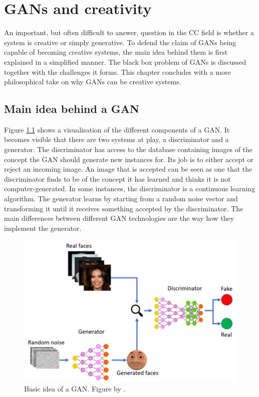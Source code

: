 \chapter{GANs and creativity}
\label{ch:generative_or_creative}


An important, but often difficult to answer, question in the CC field is whether a system is creative or simply generative.
To defend the claim of GANs being capable of becoming creative systems, the main idea behind them is first explained in a simplified manner.
The black box problem of GANs is discussed together with the challenges it forms.
This chapter concludes with a more philosophical take on why GANs can be creative systems.

\section{Main idea behind a GAN}
\label{sec:main_idea_GAN}

Figure \ref{fig:gan_explained} shows a visualisation of the different components of a GAN.
It becomes visible that there are two systems at play, a discriminator and a generator.
The discriminator has access to the database containing images of the concept the GAN should generate new instances for.
Its job is to either accept or reject an incoming image.
An image that is accepted can be seen as one that the discriminator finds to be of the concept it has learned and thinks it is not computer-generated.
In some instances, the discriminator is a continuous learning algorithm.
The generator learns by starting from a random noise vector and transforming it until it receives something accepted by the discriminator.
The main differences between different GAN technologies are the way how they implement the generator.


\begin{figure}[H]
    \centering
    \includegraphics[width=0.55\linewidth]{images/gan_explained.png}
    \captionsetup{width=0.4\linewidth}
    \captionsetup{justification=centering}
    \caption{Basic idea of a GAN. Figure by \citet{howganworks}.  }
    \label{fig:gan_explained}
\end{figure}

